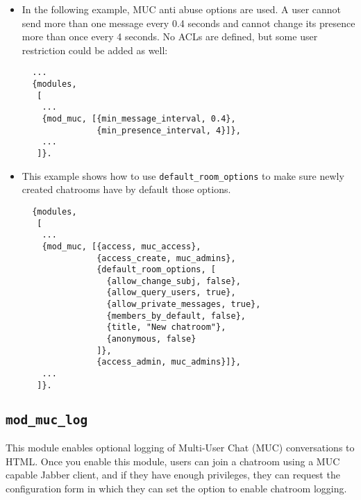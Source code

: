 \documentclass[a4paper,10pt]{book}
\newcommand{\ind}[1]{\begin{latexonly}\index{#1}\end{latexonly}}
\newcommand{\option}[1]{\texttt{#1}}
\newcommand{\module}[1]{\texttt{#1}}
\newcommand{\modmuclog}{\module{mod\_muc\_log}}
\begin{document}
\begin{itemize}
\item In the following example, MUC anti abuse options are used. A
user cannot send more than one message every 0.4 seconds and cannot
change its presence more than once every 4 seconds. No ACLs are
defined, but some user restriction could be added as well:

  \begin{verbatim}
  ...
  {modules,
   [
    ...
    {mod_muc, [{min_message_interval, 0.4},
               {min_presence_interval, 4}]},
    ...
   ]}.
\end{verbatim}

\item This example shows how to use \option{default\_room\_options} to make sure
  newly created chatrooms have by default those options.
  \begin{verbatim}
  {modules,
   [
    ...
    {mod_muc, [{access, muc_access},
               {access_create, muc_admins},
               {default_room_options, [
                 {allow_change_subj, false},
                 {allow_query_users, true},
                 {allow_private_messages, true},
                 {members_by_default, false},
                 {title, "New chatroom"},
                 {anonymous, false}
               ]},
               {access_admin, muc_admins}]},
    ...
   ]}.
\end{verbatim}
\end{itemize}

\subsection{\modmuclog{}}
\label{modmuclog}
\ind{modules!\modmuclog{}}

This module enables optional logging of Multi-User Chat (MUC) conversations to
HTML. Once you enable this module, users can join a chatroom using a MUC capable
Jabber client, and if they have enough privileges, they can request the
configuration form in which they can set the option to enable chatroom logging.
\end{document}
